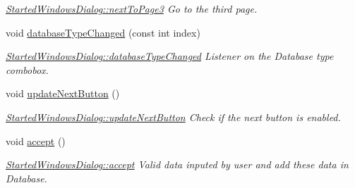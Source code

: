 \begin{DoxyCompactItemize}
\begin{DoxyCompactList}\small\item\em \hyperlink{classGui_1_1Dialogs_1_1StartedWindowsDialog_abac16c4f9fc0a3481565530fa01d8494}{Started\-Windows\-Dialog\-::next\-To\-Page3} Go to the third page. \end{DoxyCompactList}\item 
void \hyperlink{classGui_1_1Dialogs_1_1StartedWindowsDialog_a2e11f7b179785e86a86294d2d2d5357f}{database\-Type\-Changed} (const int index)
\begin{DoxyCompactList}\small\item\em \hyperlink{classGui_1_1Dialogs_1_1StartedWindowsDialog_a2e11f7b179785e86a86294d2d2d5357f}{Started\-Windows\-Dialog\-::database\-Type\-Changed} Listener on the Database type combobox. \end{DoxyCompactList}\item 
\hypertarget{classGui_1_1Dialogs_1_1StartedWindowsDialog_aedfea7b7d80e1877e50647fae5bdc052}{void \hyperlink{classGui_1_1Dialogs_1_1StartedWindowsDialog_aedfea7b7d80e1877e50647fae5bdc052}{update\-Next\-Button} ()}\label{classGui_1_1Dialogs_1_1StartedWindowsDialog_aedfea7b7d80e1877e50647fae5bdc052}

\begin{DoxyCompactList}\small\item\em \hyperlink{classGui_1_1Dialogs_1_1StartedWindowsDialog_aedfea7b7d80e1877e50647fae5bdc052}{Started\-Windows\-Dialog\-::update\-Next\-Button} Check if the next button is enabled. \end{DoxyCompactList}\item 
\hypertarget{classGui_1_1Dialogs_1_1StartedWindowsDialog_aa5da70f656530017906b5aa974fbc080}{void \hyperlink{classGui_1_1Dialogs_1_1StartedWindowsDialog_aa5da70f656530017906b5aa974fbc080}{accept} ()}\label{classGui_1_1Dialogs_1_1StartedWindowsDialog_aa5da70f656530017906b5aa974fbc080}

\begin{DoxyCompactList}\small\item\em \hyperlink{classGui_1_1Dialogs_1_1StartedWindowsDialog_aa5da70f656530017906b5aa974fbc080}{Started\-Windows\-Dialog\-::accept} Valid data inputed by user and add these data in Database. \end{DoxyCompactList}\end{DoxyCompactItemize}

